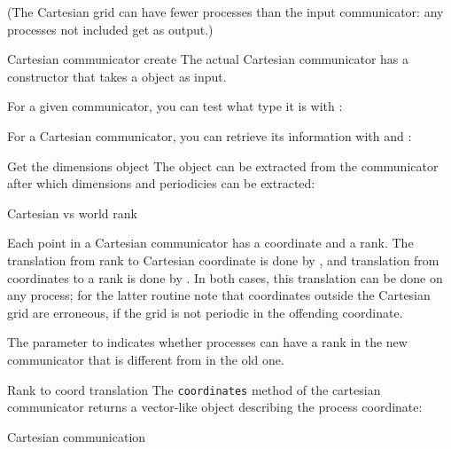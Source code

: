 
(The Cartesian grid can have fewer processes than the input communicator:
any processes not included get  as output.)

\begin{mplnote}{Cartesian communicator create}
  The actual Cartesian communicator has a constructor that
  takes a  object as input.
\end{mplnote}

For a given communicator, you can test what type it is
with :
%

For a Cartesian communicator, you can retrieve
its information with 
and :
%

\begin{mplnote}{Get the dimensions object}
  The  object can be extracted
  from the communicator
  after which dimensions and periodicies can be extracted:
\end{mplnote}

 {Cartesian vs world rank}

Each point in a Cartesian communicator has a coordinate and a rank.
The translation from rank to Cartesian coordinate is done by 
,
and translation from coordinates to a rank is done by
.
In both cases, this translation can be done on any process;
for the latter routine note that coordinates outside the
Cartesian grid are erroneous,
if the grid is not periodic in the offending coordinate.


The  parameter to 
indicates whether processes can have a rank
in the new communicator that is different from in the old one.

\begin{mplnote}{Rank to coord translation}
  The \lstinline{coordinates} method of the cartesian communicator
  returns a vector-like object describing the process coordinate:
\end{mplnote}

 {Cartesian communication}

